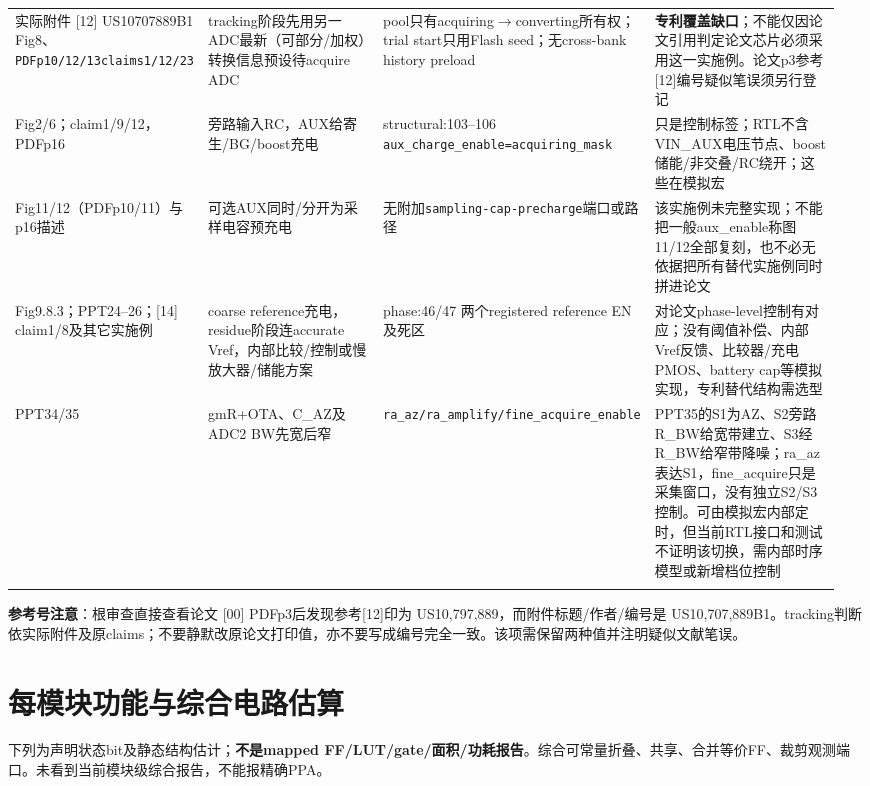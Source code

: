 \documentclass[UTF8,fontset=fandol,10pt,a4paper,openany]{ctexrep}
\newcommand{\code}[1]{\nolinkurl{#1}}
\begin{document}
\begin{longtable}{@{}>{\raggedright\arraybackslash}p{0.19\linewidth}>{\raggedright\arraybackslash}p{0.24\linewidth}>{\raggedright\arraybackslash}p{0.27\linewidth}>{\raggedright\arraybackslash}p{0.26\linewidth}@{}}
实际附件 [12] US10707889B1 Fig8、\code{PDFp10/12/13claims1/12/23} & tracking阶段先用另一ADC最新（可部分/加权）转换信息预设待acquire ADC & pool只有acquiring\ensuremath{\rightarrow}converting所有权；trial start只用Flash seed；无cross-bank history preload & \textbf{专利覆盖缺口}；不能仅因论文引用判定论文芯片必须采用这一实施例。论文p3参考[12]编号疑似笔误须另行登记\\\addlinespace[2pt]
[13] Fig2/6；claim1/9/12，PDFp16 & 旁路输入RC，AUX给寄生/BG/boost充电 & structural:103–106 \code{aux_charge_enable=acquiring_mask} & 只是控制标签；RTL不含VIN\_AUX电压节点、boost储能/非交叠/RC绕开；这些在模拟宏\\\addlinespace[2pt]
[13] Fig11/12（PDFp10/11）与p16描述 & 可选AUX同时/分开为采样电容预充电 & 无附加\code{sampling-cap-precharge}端口或路径 & 该实施例未完整实现；不能把一般aux\_enable称图11/12全部复刻，也不必无依据把所有替代实施例同时拼进论文\\\addlinespace[2pt]
[00] Fig9.8.3；PPT24–26；[14] claim1/8及其它实施例 & coarse reference充电，residue阶段连accurate Vref，内部比较/控制或慢放大器/储能方案 & phase:46/47 两个registered reference EN及死区 & 对论文phase-level控制有对应；没有阈值补偿、内部Vref反馈、比较器/充电PMOS、battery cap等模拟实现，专利替代结构需选型\\\addlinespace[2pt]
PPT34/35 & gmR+OTA、C\_AZ及ADC2 BW先宽后窄 & \code{ra_az/ra_amplify/fine_acquire_enable} & PPT35的S1为AZ、S2旁路R\_BW给宽带建立、S3经R\_BW给窄带降噪；ra\_az表达S1，fine\_acquire只是采集窗口，没有独立S2/S3控制。可由模拟宏内部定时，但当前RTL接口和测试不证明该切换，需内部时序模型或新增档位控制\\\addlinespace[2pt]
\bottomrule\end{longtable}\endgroup


\textbf{参考号注意}：根审查直接查看论文 [00] PDFp3后发现参考[12]印为 US10,797,889，而附件标题/作者/编号是 US10,707,889B1。tracking判断依实际附件及原claims；不要静默改原论文打印值，亦不要写成编号完全一致。该项需保留两种值并注明疑似文献笔误。


\section{每模块功能与综合电路估算}


下列为声明状态bit及静态结构估计；\textbf{不是mapped FF/LUT/gate/面积/功耗报告}。综合可常量折叠、共享、合并等价FF、裁剪观测端口。未看到当前模块级综合报告，不能报精确PPA。
\end{document}
